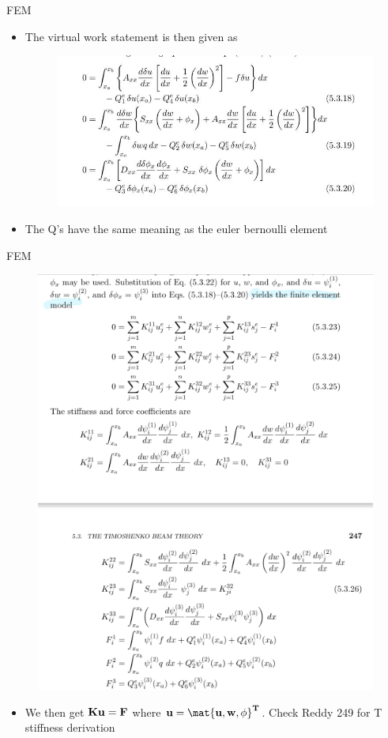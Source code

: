 	\begin{frame}{FEM}
		\begin{itemize}
			\item The virtual work statement is then given as 
			\begin{figure}
				\centering
				\includegraphics[width=0.8 \linewidth]{Figure/fig23} 		
			\end{figure}
			\item  The Q's have the same meaning as the euler bernoulli element
		\end{itemize}
	\end{frame}


	\begin{frame}{FEM}
		\begin{figure}
			\centering
			\includegraphics[width=0.5 \linewidth]{Figure/fig24} 		
		\end{figure}
		\begin{itemize}
			\item We then get $\mathbf{Ku = F}$ where $\ve{u = \mat{u,w,\phi}^T}$. Check Reddy 249 for T stiffness derivation
			
		\end{itemize}
	\end{frame}


